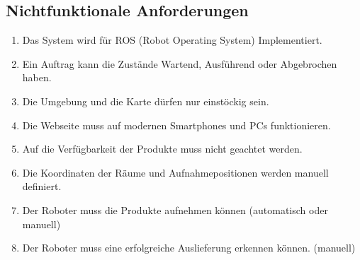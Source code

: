 \subsection{Nichtfunktionale Anforderungen}
\begin{enumerate}[nosep,style=sameline]
\renewcommand{\labelenumi}{NFA \textbf{\theenumi.}}
\item Das System wird für ROS (Robot Operating System) Implementiert.
\item Ein Auftrag kann die Zustände Wartend, Ausführend oder Abgebrochen haben.
\item Die Umgebung und die Karte dürfen nur einstöckig sein.
\item Die Webseite muss auf modernen Smartphones und PCs funktionieren.
\item Auf die Verfügbarkeit der Produkte muss nicht geachtet werden.
\item Die Koordinaten der Räume und Aufnahmepositionen werden manuell definiert.
\item Der Roboter muss die Produkte aufnehmen können (automatisch oder manuell)
\item Der Roboter muss eine erfolgreiche Auslieferung erkennen können. (manuell)
\end{enumerate}




